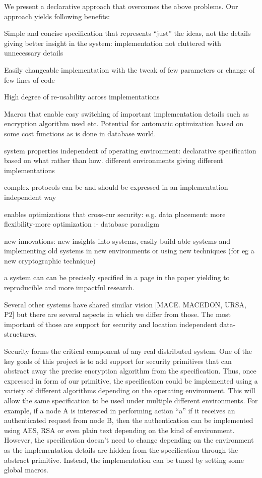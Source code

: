 We present a declarative approach that overcomes the above problems. Our approach yields following benefits:
\bi
\item Simple and concise specification that represents ``just'' the ideas, not the details giving better insight in the system: implementation not cluttered with unnecessary details
\item Easily changeable implementation with the tweak of few parameters or change of few lines of code
\item High degree of re-usability across implementations
\item Macros that enable easy switching of important implementation details such as encryption algorithm used etc. Potential for automatic optimization based on some cost functions as is done in database world.
\item system properties independent of operating environment: declarative specification based on what rather than how. different environments giving different implementations
\item complex protocols can be and should be expressed in an implementation independent way
\item enables optimizations that cross-cur security: e.g. data placement: more flexibility-more optimization :- database paradigm
\item new innovations: new insights into systems, easily build-able systems and implementing old systems in new environments or using new techniques (for eg a new cryptographic technique)
\item a system can can be precisely specified in a page in the paper yielding to reproducible and more impactful research.
\ei

Several other systems have shared similar vision [MACE. MACEDON, URSA, P2] but there are several aspects in which we differ from those. The most important of those are support for security and location independent data-structures.

Security forms the critical component of any real distributed system. One of the key goals of this project is to add support for security primitives that can abstract away the precise encryption algorithm from the specification. Thus, once expressed in form of our primitive, the specification could be implemented using a variety of different algorithms depending on the operating environment. This will allow the same specification to be used under multiple different environments. For example, if a node A is interested in performing action ``a'' if it receives an authenticated request from node B, then the authentication can be implemented using AES, RSA or even plain text depending on the kind of environment. However, the specification doesn't need to change depending on the environment as the implementation details are hidden from the specification through the abstract primitive. Instead, the implementation can be tuned by setting some global macros.

